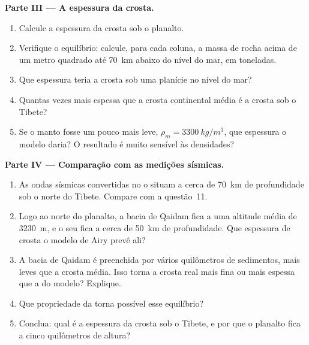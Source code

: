\begin{problem}
\medskip
\noindent\textbf{Parte III --- A espessura da crosta.}
\begin{enumerate}[resume]
  \item Calcule a espessura da crosta sob o planalto.
  \item Verifique o equilíbrio: calcule, para cada coluna, a massa de rocha
        acima de um metro quadrado até \qty{70}{km} abaixo do nível do mar,
        em toneladas.
  \item Que espessura teria a crosta sob uma planície no nível do mar?
  \item Quantas vezes mais espessa que a crosta continental média é a crosta
        sob o Tibete?
  \item Se o manto fosse um pouco mais leve, $\rho_m = \qty{3300}{kg/m^3}$,
        que espessura o modelo daria? O resultado é muito sensível às
        densidades?
\end{enumerate}

\medskip
\noindent\textbf{Parte IV --- Comparação com as medições sísmicas.}
\begin{enumerate}[resume]
  \item As ondas sísmicas convertidas no  o situam a cerca de
        \qty{70}{km} de profundidade sob o norte do Tibete. Compare com a
        questão~11.
  \item Logo ao norte do planalto, a bacia de Qaidam fica a uma altitude
        média de \qty{3230}{m}, e o seu  fica a cerca de \qty{50}{km} de
        profundidade. Que espessura de crosta o modelo de Airy prevê ali?
  \item A bacia de Qaidam é preenchida por vários quilômetros de sedimentos,
        mais leves que a crosta média. Isso torna a crosta real mais fina ou
        mais espessa que a do modelo? Explique.
  \item Que propriedade da  torna possível esse equilíbrio?
  \item Conclua: qual é a espessura da crosta sob o Tibete, e por que o
        planalto fica a cinco quilômetros de altura?
\end{enumerate}
\end{problem}
